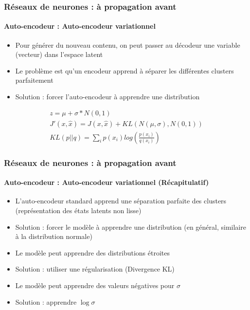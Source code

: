 \documentclass[xcolor=table]{beamer}
\begin{document}
\begin{frame}
\frametitle{Réseaux de neurones : à propagation avant}
\framesubtitle{Auto-encodeur : Auto-encodeur variationnel}

\begin{itemize}
	\item Pour générer du nouveau contenu, on peut passer au décodeur une variable (vecteur) dans l'espace latent
	\item Le problème est qu'un encodeur apprend à séparer les différentes clusters parfaitement  
	\item Solution : forcer l'auto-encodeur à apprendre une distribution  
\end{itemize}

\begin{minipage}{0.60\textwidth} 
	\begin{align*}
	z = \mu + \sigma * N(0, 1) \\
	J'(x, \hat{x}) = J(x, \hat{x}) + KL(N(\mu, \sigma), N(0, 1)) \\
	KL(p||q) = \sum_i p(x_i) log(\frac{p(x_i)}{q(x_i)})
	\end{align*}
\end{minipage}
%
\begin{minipage}{0.39\textwidth}
\end{minipage}

\end{frame}

\begin{frame}
\frametitle{Réseaux de neurones : à propagation avant}
\framesubtitle{Auto-encodeur : Auto-encodeur variationnel (Récapitulatif)}

\begin{itemize}
	\item L'auto-encodeur standard apprend une séparation parfaite des clusters (représentation des états latents non lisse)
	\item Solution : forcer le modèle à apprendre une distribution (en général, similaire à la distribution normale)
	\item Le modèle peut apprendre des distributions étroites 
	\item Solution : utiliser une régularisation (Divergence KL)
	\item Le modèle peut apprendre des valeurs négatives pour $\sigma$
	\item Solution : apprendre $\log \sigma$
\end{itemize}

\end{frame}
\end{document}
